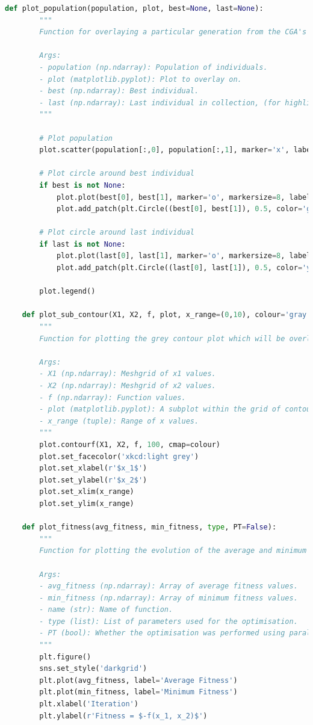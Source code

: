 \documentclass[10pt]{article}
\begin{document}
\begin{lstlisting}[language=Python, caption=plotting\_functions.py, label=plotting_functionspy]
    def plot_population(population, plot, best=None, last=None):
        """
        Function for overlaying a particular generation from the CGA's optimisation on a contour plot in R^2.
    
        Args:
        - population (np.ndarray): Population of individuals.
        - plot (matplotlib.pyplot): Plot to overlay on.
        - best (np.ndarray): Best individual.
        - last (np.ndarray): Last individual in collection, (for highlighting to visualise MCMC moves).
        """
    
        # Plot population
        plot.scatter(population[:,0], population[:,1], marker='x', label='Population', color='red')
        
        # Plot circle around best individual
        if best is not None:
            plot.plot(best[0], best[1], marker='o', markersize=8, label='Best', color='green')
            plot.add_patch(plt.Circle((best[0], best[1]), 0.5, color='green', fill=False)) 
    
        # Plot circle around last individual
        if last is not None:
            plot.plot(last[0], last[1], marker='o', markersize=8, label='Tracked', color='yellow')
            plot.add_patch(plt.Circle((last[0], last[1]), 0.5, color='yellow', fill=False))
        
        plot.legend()
    
    def plot_sub_contour(X1, X2, f, plot, x_range=(0,10), colour='gray'):
        """
        Function for plotting the grey contour plot which will be overlayed with the population during optimisation.
    
        Args:
        - X1 (np.ndarray): Meshgrid of x1 values.
        - X2 (np.ndarray): Meshgrid of x2 values.
        - f (np.ndarray): Function values.
        - plot (matplotlib.pyplot): A subplot within the grid of contours to plot the contour on.
        - x_range (tuple): Range of x values.
        """
        plot.contourf(X1, X2, f, 100, cmap=colour)
        plot.set_facecolor('xkcd:light grey')
        plot.set_xlabel(r'$x_1$')
        plot.set_ylabel(r'$x_2$')
        plot.set_xlim(x_range)
        plot.set_ylim(x_range)
    
    def plot_fitness(avg_fitness, min_fitness, type, PT=False):
        """
        Function for plotting the evolution of the average and minimum fitness of a population.
    
        Args:
        - avg_fitness (np.ndarray): Array of average fitness values.
        - min_fitness (np.ndarray): Array of minimum fitness values.
        - name (str): Name of function.
        - type (list): List of parameters used for the optimisation.
        - PT (bool): Whether the optimisation was performed using parallel tempering or not.
        """
        plt.figure()
        sns.set_style('darkgrid')
        plt.plot(avg_fitness, label='Average Fitness')
        plt.plot(min_fitness, label='Minimum Fitness')
        plt.xlabel('Iteration')
        plt.ylabel(r'Fitness = $-f(x_1, x_2)$')
    

\end{lstlisting}
\end{document}
